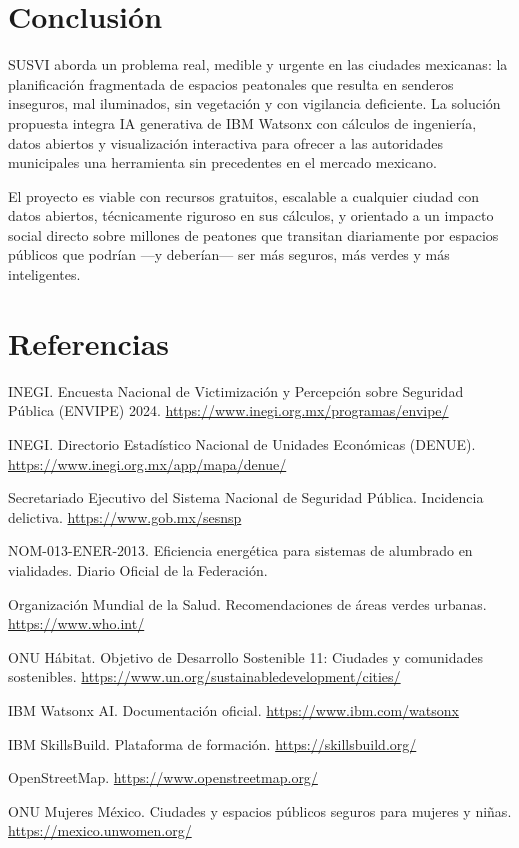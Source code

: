 \documentclass[12pt,a4paper]{article}
\begin{document}
\section{Conclusión}

SUSVI aborda un problema real, medible y urgente en las ciudades mexicanas: la planificación fragmentada de espacios peatonales que resulta en senderos inseguros, mal iluminados, sin vegetación y con vigilancia deficiente. La solución propuesta integra IA generativa de IBM Watsonx con cálculos de ingeniería, datos abiertos y visualización interactiva para ofrecer a las autoridades municipales una herramienta sin precedentes en el mercado mexicano.

El proyecto es viable con recursos gratuitos, escalable a cualquier ciudad con datos abiertos, técnicamente riguroso en sus cálculos, y orientado a un impacto social directo sobre millones de peatones que transitan diariamente por espacios públicos que podrían —y deberían— ser más seguros, más verdes y más inteligentes.


\newpage
\section{Referencias}

\begin{enumerate}[label={[\arabic*]}]
    \item INEGI. Encuesta Nacional de Victimización y Percepción sobre Seguridad Pública (ENVIPE) 2024. \url{https://www.inegi.org.mx/programas/envipe/}
    \item INEGI. Directorio Estadístico Nacional de Unidades Económicas (DENUE). \url{https://www.inegi.org.mx/app/mapa/denue/}
    \item Secretariado Ejecutivo del Sistema Nacional de Seguridad Pública. Incidencia delictiva. \url{https://www.gob.mx/sesnsp}
    \item NOM-013-ENER-2013. Eficiencia energética para sistemas de alumbrado en vialidades. Diario Oficial de la Federación.
    \item Organización Mundial de la Salud. Recomendaciones de áreas verdes urbanas. \url{https://www.who.int/}
    \item ONU Hábitat. Objetivo de Desarrollo Sostenible 11: Ciudades y comunidades sostenibles. \url{https://www.un.org/sustainabledevelopment/cities/}
    \item IBM Watsonx AI. Documentación oficial. \url{https://www.ibm.com/watsonx}
    \item IBM SkillsBuild. Plataforma de formación. \url{https://skillsbuild.org/}
    \item OpenStreetMap. \url{https://www.openstreetmap.org/}
    \item ONU Mujeres México. Ciudades y espacios públicos seguros para mujeres y niñas. \url{https://mexico.unwomen.org/}
\end{enumerate}
\end{document}
